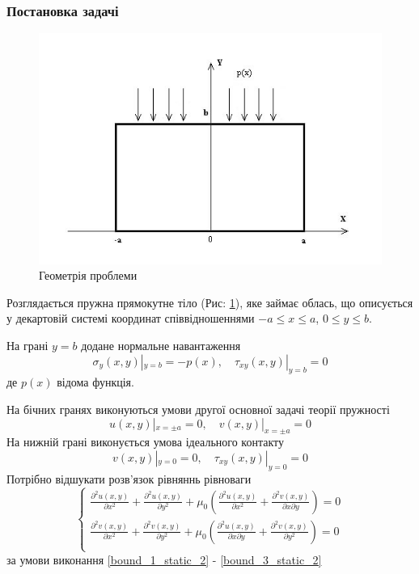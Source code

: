 \subsubsection{Постановка задачі}
\begin{figure}[ht!]
    \begin{center}
        \includegraphics[scale=1]{images/geometry/image_1.jpg}
    \end{center}
    \caption{Геометрія проблеми}\label{geom_static_2}
\end{figure}
Розглядається пружна прямокутне тіло (Рис: \ref{geom_static_2}), яке займає облась,
що описується у декартовій системі координат співвідношеннями $-a \le x \le a$, $0 \le y \le b$.

На грані $y=b$ додане нормальне навантаження
\begin{equation}\label{bound_1_static_2}
    \sigma_y(x, y) |_{y=b} = -p(x), \quad  \tau_{xy}(x,y) |_{y=b} =0
\end{equation}
де $p(x)$ відома функція.

На бічних гранях виконуються умови другої основної задачі теорії пружності
\begin{equation}\label{bound_2_static_2}
    u(x,y) |_{x=\pm a} = 0, \quad v(x,y) |_{x=\pm a} =0
\end{equation}
На нижній грані виконується умова ідеального контакту
\begin{equation}\label{bound_3_static_2}
    v(x,y) |_{y=0} = 0, \quad \tau_{xy}(x,y) |_{y=0} =0
\end{equation}
Потрібно відшукати розв'язок рівняннь рівноваги
\begin{equation}\label{lame_static_2}
    \begin{cases}
        \frac{\partial^2 u(x,y)}{\partial x^2} + \frac{\partial^2 u(x,y)}{\partial y^2} + \mu_0 (\frac{\partial^2 u(x,y)}{\partial x^2} + \frac{\partial^2 v(x,y)}{\partial x\partial y}) = 0 \\
        \frac{\partial^2 v(x,y)}{\partial x^2} + \frac{\partial^2 v(x,y)}{\partial y^2} + \mu_0 (\frac{\partial^2 u(x,y)}{\partial x \partial y} + \frac{\partial^2 v(x,y)}{\partial y^2}) = 0 \\
    \end{cases}
\end{equation}
за умови виконання \eqref{bound_1_static_2} - \eqref{bound_3_static_2}

